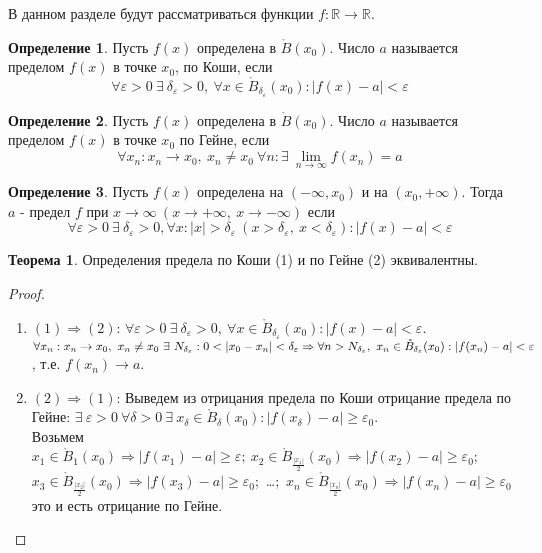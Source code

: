 \documentclass[a4paper, 12pt]{article}
\newcommand{\R}{\mathbb{R}}
\newcommand{\Bo}{\mathring{B}}
\renewcommand{\epsilon}{\varepsilon}
\newcommand\tab[1][.5cm]{\hspace*{#1}}
\newcommand{\lims}{\lim\limits_{n\to \infty}}
\theoremstyle{definition}
\newtheorem*{definition}{Определение}
\newtheorem*{theorem}{Теорема}
\begin{document}
        В данном разделе будут рассматриваться функции $f: \R\to\R$.
        \begin{definition}
            Пусть $f(x)$ определена в $\mathring{B}(x_0)$. Число $a$ называется пределом $f(x)$ в точке $x_0$, по Коши, если  
            \[\forall \epsilon>0\ \exists\ \delta_{\epsilon}>0,\ \forall x\in \Bo_{\delta_{\epsilon}}(x_0): |f(x)-a|<\epsilon\]
        \end{definition} 
        \begin{definition}
            Пусть $f(x)$ определена в $\Bo(x_0)$. Число $a$ называется пределом $f(x)$ в точке $x_0$ по Гейне, если
            \[\forall x_n: x_n\to x_0,\ x_n\ne x_0\ \forall n: \exists\ \lims f(x_n)=a\]
        \end{definition} 
        \begin{definition}
            Пусть $f(x)$ определена на $(-\infty, x_0)$ и на $(x_0, +\infty)$. Тогда \\
            $a$ - предел $f$ при $x\to \infty\ (x\to +\infty,\ x\to -\infty)$ если 
            \[\forall \epsilon>0\ \exists\ \delta_{\epsilon}>0, \forall x: |x|>\delta_{\epsilon}\ (x>\delta_{\epsilon},\ x<\delta_{\epsilon}): |f(x)-a|<\epsilon\]
        \end{definition} 
        \begin{theorem} 
            Определения предела по Коши (1) и по Гейне (2) эквивалентны.
        \end{theorem} 
        \begin{proof}\tab
            \begin{enumerate}
                \item $(1)\Rightarrow(2)$: $\forall \epsilon>0\ \exists\ \delta_{\epsilon}>0,\ \forall x\in \Bo_{\delta_{\epsilon}}(x_0): |f(x)-a|<\epsilon$.\\
                $\forall x_n: x_n\to x_0,\ x_n\ne x_0\ \exists\ N_{\delta_{\epsilon}}: 0<|x_0-x_n|<\delta_{\epsilon}\\
                \Rightarrow \forall n> N_{\delta_{\epsilon}},\ x_n\in \Bo_{\delta_{\epsilon}}(x_0): |f(x_n)-a|<\epsilon$, т.е. $f(x_n)\to a$.
                \item $(2)\Rightarrow(1)$: Выведем из отрицания предела по Коши отрицание предела по Гейне: $\exists\ \epsilon> 0\ \forall \delta>0\ \exists\ x_{\delta}\in \Bo_{\delta}(x_0): |f(x_{\delta})-a|\geq \epsilon_0$.\\
                Возьмем $x_1 \in \Bo_1(x_0) \Rightarrow |f(x_1)-a|\geq \epsilon;\ x_2 \in \Bo_{\frac{|x_1|}{2}}(x_0) \Rightarrow |f(x_2)-a|\geq \epsilon_0$;\\
                $x_3\in \Bo_{\frac{|x_2|}{2}}(x_0) \Rightarrow |f(x_3)-a|\geq \epsilon_0$;\ \dots;\ $x_n \in \Bo_{\frac{|x_n|}{2}}(x_0) \Rightarrow |f(x_n)-a|\geq \epsilon_0$\\
                это и есть отрицание по Гейне.
            \end{enumerate}
        \end{proof} 
\end{document}
